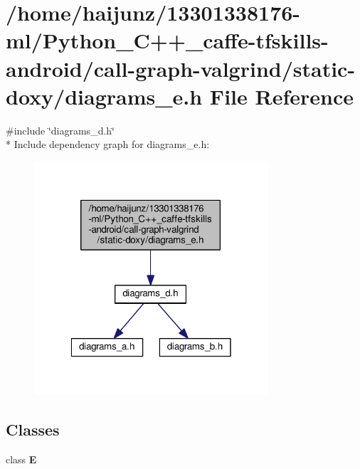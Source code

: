 \section{/home/haijunz/13301338176-\/ml/\-Python\-\_\-\-C++\-\_\-caffe-\/tfskills-\/android/call-\/graph-\/valgrind/static-\/doxy/diagrams\-\_\-e.h File Reference}
\label{diagrams__e_8h}
{\ttfamily \#include \char`\"{}diagrams\-\_\-d.\-h\char`\"{}}\\*
Include dependency graph for diagrams\-\_\-e.\-h\-:\nopagebreak
\begin{figure}[H]
\begin{center}
\leavevmode
\includegraphics[width=247pt]{diagrams__e_8h__incl}
\end{center}
\end{figure}
\subsection*{Classes}
\begin{DoxyCompactItemize}
\item 
class {\bf E}
\end{DoxyCompactItemize}
